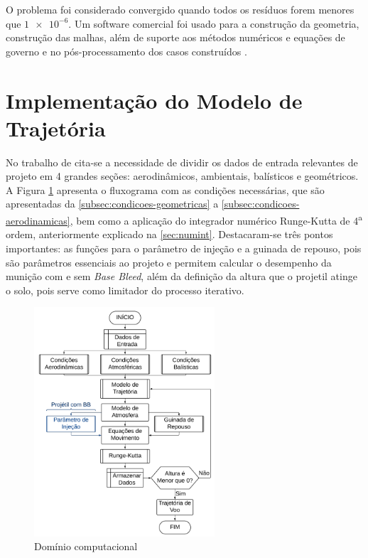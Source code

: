 O problema foi considerado convergido quando todos os resíduos forem menores que $\num{1e-6}$. Um software comercial foi usado para a construção da geometria, construção das malhas, além de suporte aos métodos numéricos e equações de governo e no pós-processamento dos casos construídos \cite{fluent2021ansys}.

\section{Implementação do Modelo de Trajetória}\label{subsec:implementacao-trajetoria}

No trabalho de \citeauthor{Rosendo2020} cita-se a necessidade de dividir os dados de entrada relevantes de projeto em 4 grandes seções: aerodinâmicos, ambientais, balísticos e geométricos. A Figura \ref{fig:fluxograma-mpmtm} apresenta o fluxograma com as condições necessárias, que são apresentadas da \autoref{subsec:condicoes-geometricas} a \autoref{subsec:condicoes-aerodinamicas}, bem como a aplicação do integrador numérico Runge-Kutta de 4\textsuperscript{a} ordem, anteriormente explicado na \autoref{sec:numint}. Destacaram-se três pontos importantes: as funções para o parâmetro de injeção e a guinada de repouso, pois são parâmetros essenciais ao projeto e permitem calcular o desempenho da munição com e sem \textit{Base Bleed}, além da definição da altura que o projetil atinge o solo, pois serve como limitador do processo iterativo. 

\begin{figure}[!ht]
	\centering
	\includegraphics[width=0.6\textwidth]{foto03-fluxograma-mpmtm.png}
	\caption{Domínio computacional}
	\label{fig:fluxograma-mpmtm}
\end{figure}

